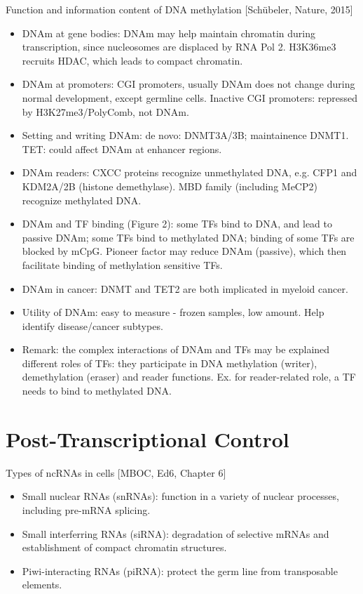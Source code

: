 \documentclass{report}
\begin{document}
Function and information content of DNA methylation [Schübeler, Nature, 2015]
\begin{itemize}
	\item DNAm at gene bodies: DNAm may help maintain chromatin during transcription, since nucleosomes are displaced by RNA Pol 2. H3K36me3 recruits HDAC, which leads to compact chromatin.
	
	\item DNAm at promoters: CGI promoters, usually DNAm does not change during normal development, except germline cells. Inactive CGI promoters: repressed by H3K27me3/PolyComb, not DNAm.
	
	\item Setting and writing DNAm: de novo: DNMT3A/3B; maintainence DNMT1. TET: could affect DNAm at enhancer regions.
	
	\item DNAm readers: CXCC proteins recognize unmethylated DNA, e.g. CFP1 and KDM2A/2B (histone demethylase). MBD family (including MeCP2) recognize methylated DNA.
	
	\item DNAm and TF binding (Figure 2): some TFs bind to DNA, and lead to passive DNAm; some TFs bind to methylated DNA; binding of some TFs are blocked by mCpG. Pioneer factor may reduce DNAm (passive), which then facilitate binding of methylation sensitive TFs.
	
	\item DNAm in cancer: DNMT and TET2 are both implicated in myeloid cancer.
	
	\item Utility of DNAm: easy to measure - frozen samples, low amount. Help identify disease/cancer subtypes.
	
	\item Remark: the complex interactions of DNAm and TFs may be explained different roles of TFs: they participate in DNA methylation (writer), demethylation (eraser) and reader functions. Ex. for reader-related role, a TF needs to bind to methylated DNA. 
\end{itemize}
\section{Post-Transcriptional Control}

Types of ncRNAs in cells [MBOC, Ed6, Chapter 6]
\begin{itemize}
	\item Small nuclear RNAs (snRNAs): function in a variety of nuclear processes, including pre-mRNA splicing. 
	
	\item Small interferring RNAs (siRNA): degradation of selective mRNAs and establishment of compact chromatin structures. 
	
	\item Piwi-interacting RNAs (piRNA): protect the germ line from transposable elements. 
\end{itemize}
\end{document}
